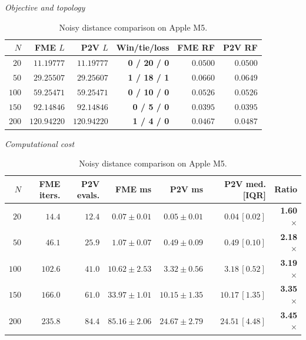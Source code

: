 \begin{table}[!htbp]
\centering\small
\setlength{\tabcolsep}{4pt}
\caption{Noisy distance comparison on Apple M5.}
\label{tab:bench_noisy}
\par\smallskip
\textit{Objective and topology}\par\smallskip
\begin{tabular}{@{}rrrrrr@{}}
\toprule
$N$ & FME $L$ & P2V $L$ & Win/tie/loss & FME RF & P2V RF\\
\midrule
$20$ & $11.19777$ & $11.19777$ & \textbf{0 / 20 / 0} & $0.0500$ & $0.0500$\\
$50$ & $29.25507$ & $29.25607$ & \textbf{1 / 18 / 1} & $0.0660$ & $0.0649$\\
$100$ & $59.25471$ & $59.25471$ & \textbf{0 / 10 / 0} & $0.0526$ & $0.0526$\\
$150$ & $92.14846$ & $92.14846$ & \textbf{0 / 5 / 0} & $0.0395$ & $0.0395$\\
$200$ & $120.94220$ & $120.94220$ & \textbf{1 / 4 / 0} & $0.0467$ & $0.0487$\\
\bottomrule
\end{tabular}
\par\smallskip
\textit{Computational cost}\par\smallskip
\begin{tabular}{@{}rrrrrrr@{}}
\toprule
$N$ & FME iters. & P2V evals. & FME ms & P2V ms & P2V med. [IQR] & Ratio\\
\midrule
$20$ & $14.4$ & $12.4$ & $0.07 \pm 0.01$ & $0.05 \pm 0.01$ & $0.04\,[0.02]$ & \textbf{1.60$\times$}\\
$50$ & $46.1$ & $25.9$ & $1.07 \pm 0.07$ & $0.49 \pm 0.09$ & $0.49\,[0.10]$ & \textbf{2.18$\times$}\\
$100$ & $102.6$ & $41.0$ & $10.62 \pm 2.53$ & $3.32 \pm 0.56$ & $3.18\,[0.52]$ & \textbf{3.19$\times$}\\
$150$ & $166.0$ & $61.0$ & $33.97 \pm 1.01$ & $10.15 \pm 1.35$ & $10.17\,[1.35]$ & \textbf{3.35$\times$}\\
$200$ & $235.8$ & $84.4$ & $85.16 \pm 2.06$ & $24.67 \pm 2.79$ & $24.51\,[4.48]$ & \textbf{3.45$\times$}\\
\bottomrule
\end{tabular}

\end{table}
